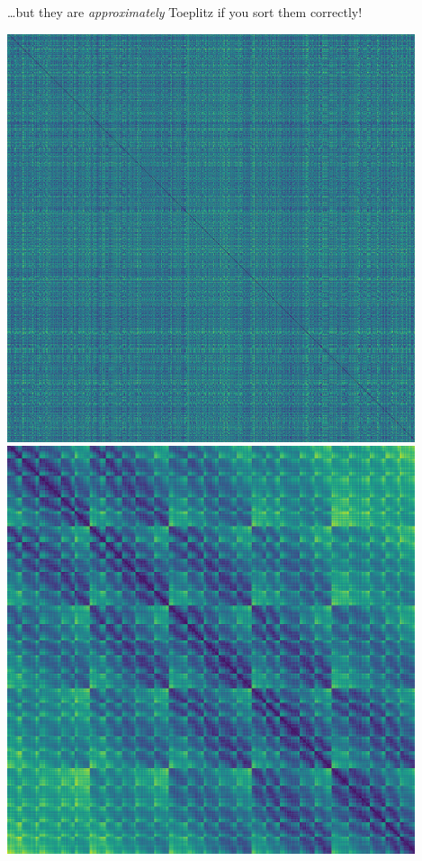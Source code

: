 \documentclass[aspectratio=169, usenames, dvipsnames]{beamer}
\begin{document}
\begin{frame}{\ldots but they are \emph{approximately} Toeplitz if you sort them correctly!}
  \begin{center}
    \includegraphics[height=0.8\textheight]{figures/dist_mat_unsorted}
    \hspace{0.5cm}
    \includegraphics[height=0.8\textheight]{figures/dist_mat_sorted}
  \end{center}
\end{frame}
\end{document}
